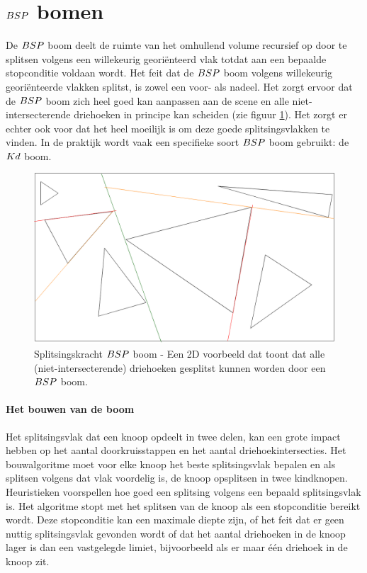 \section{$\symBSP$ bomen}
    De $\symBSP$ boom deelt de ruimte van het omhullend volume recursief op door te splitsen volgens een willekeurig georiënteerd vlak totdat aan een bepaalde stopconditie voldaan wordt.
    Het feit dat de $\symBSP$ boom volgens willekeurig georiënteerde vlakken splitst, is zowel een voor- als nadeel.
    Het zorgt ervoor dat de $\symBSP$ boom zich heel goed kan aanpassen aan de scene en alle niet-intersecterende driehoeken in principe kan scheiden (zie figuur \ref{fig:splitsing-bsp}).
    Het zorgt er echter ook voor dat het heel moeilijk is om deze goede splitsingsvlakken te vinden.
    In de praktijk wordt vaak een specifieke soort $\symBSP$ boom gebruikt: de $Kd$ boom.
    \begin{figure}
        \centering
        \includegraphics[width=\linewidth]{img/splitsing-BSP}
        \caption[Splitsingskracht $\symBSP$ boom]%
        {Splitsingskracht $\symBSP$ boom - \small Een 2D voorbeeld dat toont dat alle (niet-intersecterende) driehoeken gesplitst kunnen worden door een $\symBSP$ boom.}
        \label{fig:splitsing-bsp}    
    \end{figure}    
    \paragraph{Het bouwen van de boom}
    Het splitsingsvlak dat een knoop opdeelt in twee delen, kan een grote impact hebben op het aantal doorkruisstappen en het aantal driehoekintersecties.
    Het bouwalgoritme moet voor elke knoop het beste splitsingsvlak bepalen en als splitsen volgens dat vlak voordelig is, de knoop opsplitsen in twee kindknopen.
    Heuristieken voorspellen hoe goed een splitsing volgens een bepaald splitsingsvlak is.   
    Het algoritme stopt met het splitsen van de knoop als een stopconditie bereikt wordt.
    Deze stopconditie kan een maximale diepte zijn, of het feit dat er geen nuttig splitsingsvlak gevonden wordt of dat het aantal driehoeken in de knoop lager is dan een vastgelegde limiet, bijvoorbeeld als er maar één driehoek in de knoop zit.

